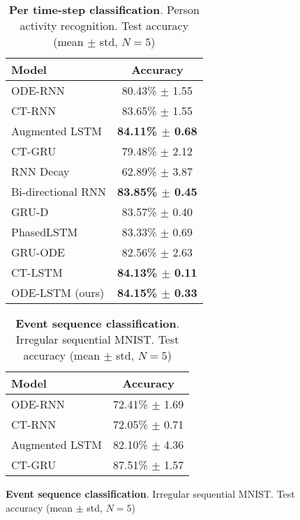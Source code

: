 \documentclass{article}
\makeatletter
\def\adl@drawiv#1#2#3{\hskip.5\tabcolsep
    \xleaders#3{#2.5\@tempdimb #1{1}#2.5\@tempdimb}#2\z@ plus1fil minus1fil\relax
    \hskip.5\tabcolsep}
\newcommand{\cdashlinelr}[1]{\noalign{\vskip\aboverulesep
        \global\let\@dashdrawstore\adl@draw
        \global\let\adl@draw\adl@drawiv}
    \cdashline{#1}
    \noalign{\global\let\adl@draw\@dashdrawstore
        \vskip\belowrulesep}}
\makeatother
\begin{document}
\begin{figure}[!t]
  \begin{minipage}{\textwidth}
  \vspace{0mm}
  \begin{minipage}[b]{0.45\textwidth}
    \centering
 \begin{table}[H]
    \centering
    \caption{\textbf{Per time-step classification}. Person activity recognition. Test accuracy (mean $\pm$ std, $N=5$)}
    \vspace{0mm}
    \begin{tabular}{lc}
    \toprule
    Model & Accuracy \\
    \hline
    ODE-RNN  & 80.43\% $\pm$ 1.55 \\
    CT-RNN  & 83.65\% $\pm$ 1.55 \\
    Augmented LSTM  & \textbf{84.11\% $\pm$ 0.68} \\
    CT-GRU & 79.48\% $\pm$ 2.12 \\
    RNN Decay & 62.89\% $\pm$ 3.87 \\
    Bi-directional RNN  &  \textbf{83.85\% $\pm$ 0.45} \\
    GRU-D  &  83.57\% $\pm$ 0.40 \\
    PhasedLSTM  &  83.33\% $\pm$ 0.69 \\
    GRU-ODE  & 82.56\% $\pm$ 2.63 \\
    CT-LSTM &  \textbf{84.13\% $\pm$ 0.11} \\
    \cdashlinelr{1-2}
    ODE-LSTM (ours)  &  \textbf{84.15\% $\pm$ 0.33} \\
    \bottomrule
    \end{tabular}
\label{tab:real_human_activity}
\end{table}
  \end{minipage}
  \hfill
  \begin{minipage}[b]{0.45\textwidth}
    \centering
 \begin{table}[H]
    \centering
    \caption{\textbf{Event sequence classification}. Irregular sequential MNIST. Test accuracy (mean $\pm$ std, $N=5$)}
    \vspace{0mm}
    \begin{tabular}{lc}
    \toprule
    Model &  Accuracy \\
    \hline
    ODE-RNN   & 72.41\% $\pm$ 1.69\\
    CT-RNN   & 72.05\% $\pm$ 0.71\\
    Augmented LSTM   & 82.10\% $\pm$ 4.36\\
    CT-GRU  & 87.51\% $\pm$ 1.57\\

\end{tabular}
\end{table}
\end{minipage}
\end{minipage}
\end{figure}
\end{document}
